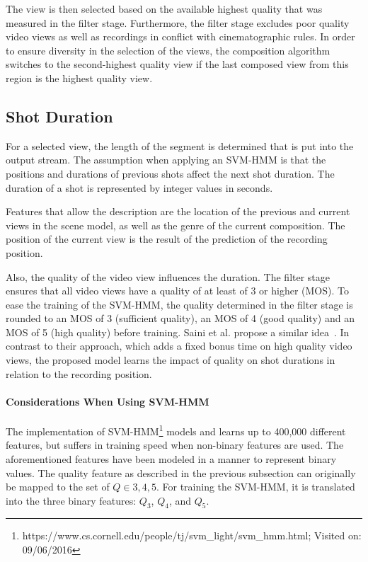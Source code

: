 The view is then selected based on the available highest quality that was measured in the filter stage.
Furthermore, the filter stage excludes poor quality video views as well as recordings in conflict with cinematographic rules. 
In order to ensure diversity in the selection of the views, the composition algorithm switches to the second-highest quality view if the last composed view from this region is the highest quality view.
\subsection{Shot Duration}
For a selected view, the length of the segment is determined that is put into the output stream.
The assumption when applying an \ac{SVM-HMM} is that the positions and durations of previous shots affect the next shot duration.
The duration of a shot is represented by integer values in seconds.

Features that allow the description are the location of the previous and current views in the scene model, as well as the genre of the current composition.
The position of the current view is the result of the prediction of the recording position.

Also, the quality of the video view influences the duration.
The filter stage ensures that all video views have a quality of at least of 3 or higher (\ac{MOS}).
To ease the training of the \ac{SVM-HMM}, the quality determined in the filter stage is rounded to an \ac{MOS} of 3 (sufficient quality), an \ac{MOS} of 4 (good quality) and an \ac{MOS} of 5 (high quality) before training.
Saini et al. propose a similar idea~\cite{Saini2012}.
In contrast to their approach, which adds a fixed bonus time on high quality video views, the proposed model learns the impact of quality on shot durations in relation to the recording position.
\paragraph{Considerations When Using SVM-HMM}
The implementation of \ac{SVM-HMM}\footnote{https://www.cs.cornell.edu/people/tj/svm\_light/svm\_hmm.html; Visited on: 09/06/2016} models and learns up to 400,000 different features, but suffers in training speed when non-binary features are used.
The aforementioned features have been modeled in a manner to represent binary values.
The quality feature as described in the previous subsection can originally be mapped to the set of $Q \in {3,4,5}$.
For training the \ac{SVM-HMM}, it is translated into the three binary features: $Q_3$, $Q_4$, and $Q_5$.
